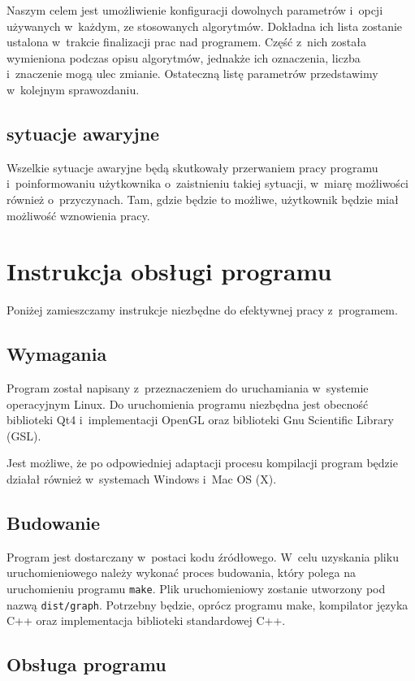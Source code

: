 \documentclass[a4paper,onecolumn,oneside,12pt]{mwart}
\begin{document}
Naszym celem jest umożliwienie konfiguracji dowolnych parametrów i~opcji
używanych w~każdym, ze stosowanych algorytmów. Dokładna ich lista zostanie
ustalona w~trakcie finalizacji prac nad programem. Część z~nich została
wymieniona podczas opisu algorytmów, jednakże ich oznaczenia, liczba
i~znaczenie mogą ulec zmianie. Ostateczną listę parametrów przedstawimy
w~kolejnym sprawozdaniu.

\subsection{sytuacje awaryjne}

Wszelkie sytuacje awaryjne będą skutkowały przerwaniem pracy programu
i~poinformowaniu użytkownika o~zaistnieniu takiej sytuacji, w~miarę
możliwości również o~przyczynach. Tam, gdzie będzie to możliwe, użytkownik
będzie miał możliwość wznowienia pracy.

\section{Instrukcja obsługi programu}

Poniżej zamieszczamy instrukcje niezbędne do efektywnej pracy z~programem.

\subsection{Wymagania}

Program został napisany z~przeznaczeniem do uruchamiania w~systemie
operacyjnym Linux. Do uruchomienia programu niezbędna jest obecność
biblioteki Qt4 i~implementacji OpenGL oraz biblioteki Gnu Scientific
Library (GSL).

Jest możliwe, że po odpowiedniej adaptacji procesu kompilacji program
będzie działał również w~systemach Windows i~Mac OS (X).

\subsection{Budowanie}

Program jest dostarczany w~postaci kodu źródłowego. W~celu uzyskania
pliku uruchomieniowego należy wykonać proces budowania, który polega na
uruchomieniu programu \texttt{make}. Plik uruchomieniowy zostanie utworzony
pod nazwą \texttt{dist/graph}. Potrzebny będzie, oprócz programu make,
kompilator języka C++ oraz implementacja biblioteki standardowej C++.

\subsection{Obsługa programu}
\end{document}
